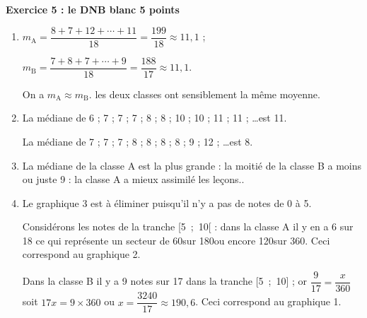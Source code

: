 \textbf{Exercice 5 : le DNB blanc \hfill 5 points}

\medskip  

%
%
%

\begin{enumerate}
\item %
$m_{\text{A}} = \dfrac{8 + 7 + 12 + \cdots + 11}{18} = \dfrac{199}{18} \approx 11,1$ ;

$m_{\text{B}} = \dfrac{7 + 8 + 7 + \cdots + 9}{18} = \dfrac{188}{17} \approx 11,1$.

On a $m_{\text{A}} \approx m_{\text{B}}$. les deux classes ont sensiblement la même moyenne. 
\item %
La médiane de 6 ; 7 ; 7 ; 7 ; 8 ; 8 ; 10 ; 10 ; 11 ; 11 ; \ldots est 11.

La médiane de 7 ; 7 ; 7 ; 8 ; 8 ; 8 ; 8 ; 9 ; 12 ; \ldots est 8.
\item %
La médiane de la classe A est la plus grande : la moitié de la classe B a moins ou juste 9 : la classe A a mieux assimilé les leçons..
\item %

Le graphique 3 est à éliminer puisqu'il n'y a pas de notes de 0 à 5.

Considérons les notes de la tranche [5~;~10[ : dans la classe A il y en a 6 sur 18 ce qui représente un secteur de 60\degres sur 180\degres ou encore 120\degres sur 360\degres. Ceci  correspond au graphique 2.

Dans la classe B il y a 9 notes sur 17 dans la tranche [5~;~10]  ; or $\dfrac{9}{17} = \dfrac{x}{360}$ soit $17x = 9 \times 360$ ou $x = \dfrac{3240}{17} \approx 190,6$\degres. Ceci correspond au graphique 1.
\end{enumerate}

